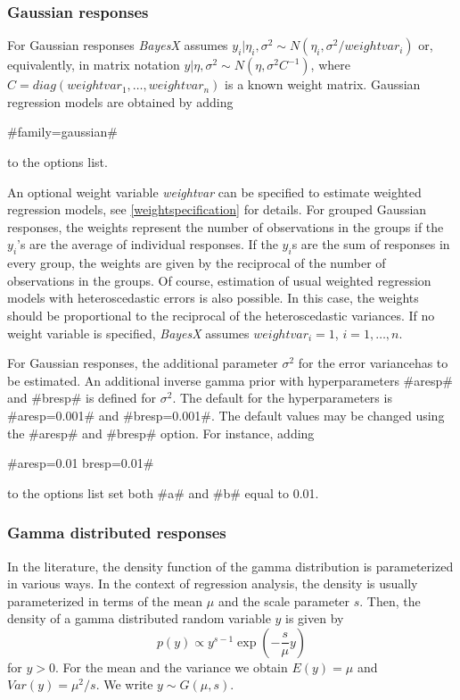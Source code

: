 \subsubsection*{Gaussian responses}

For Gaussian responses {\em BayesX} assumes $y_i | \eta_i,\sigma^2
\sim N(\eta_i,\sigma^2/weightvar_i)$ or, equivalently, in matrix
notation $y | \eta, \sigma^2 \sim N(\eta,\sigma^2C^{-1})$, where
$C=diag(weightvar_1,\dots,weightvar_n)$ is a known weight matrix.
Gaussian regression models are obtained by adding

#family=gaussian#

to the options list.

An optional weight variable {\em weightvar} can be specified to
estimate weighted regression models, see
\autoref{weightspecification} for details. For grouped Gaussian
responses, the weights represent the number of observations in the
groups if the $y_i$'s are the average of individual responses. If
the $y_i$s are the sum of responses in every group, the weights
are given by the reciprocal of the number of observations in the
groups. Of course, estimation of usual weighted regression models
with heteroscedastic errors is also possible. In this case, the
weights should be proportional to the reciprocal of the
heteroscedastic variances. If no weight variable is specified,
{\em BayesX} assumes $weightvar_i = 1$, $i=1,\dots,n$.

For Gaussian responses, the additional parameter $\sigma^2$ for
the error variancehas to be estimated. An additional inverse gamma
prior with hyperparameters #aresp# and #bresp# is defined for
$\sigma^2$. The default for the hyperparameters is #aresp=0.001#
and #bresp=0.001#. The default values may be changed using the
#aresp# and #bresp# option. For instance, adding

#aresp=0.01 bresp=0.01#

to the options list set both #a# and #b# equal to 0.01.

\subsubsection*{Gamma distributed responses}

In the literature, the density function of the gamma distribution
is parameterized in various ways. In the context of regression
analysis, the density is usually parameterized in terms of the
mean $\mu$ and the scale parameter $s$. Then, the density of a
gamma distributed random variable $y$ is given by
\begin{equation}
\label{gammapar1} p(y) \propto y^{s-1}\exp \left( -\frac{s}{\mu} y \right)
\end{equation}
for $y > 0$. For the mean and the variance we obtain $E(y) = \mu$
and $Var(y) = \mu^2/s$. We write $y \sim G(\mu,s)$.


